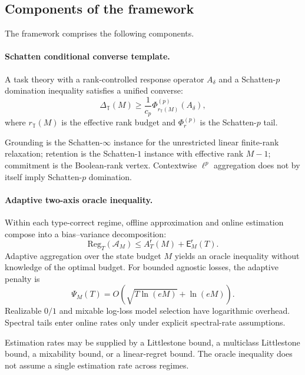 \documentclass[12pt]{article}
\theoremstyle{definition}
\newcommand{\Reg}{\mathrm{Reg}}
\newcommand{\Est}{\mathsf E}
\newcommand{\Aapp}{A_T}
\newcommand{\PsiAgg}{\Psi}
\begin{document}
\subsection{Components of the framework}
\label{subsec:integrated-components-intro}

The framework comprises the following components.

\paragraph{Schatten conditional converse template.}
A task theory with a rank-controlled response operator $A_\delta$ and a
Schatten-$p$ domination inequality satisfies a unified converse:
\[
\Delta_{\mathbb T}(M)
\ge
\frac1{c_p}
\Phi^{(p)}_{r_{\mathbb T}(M)}(A_\delta),
\]
where $r_{\mathbb T}(M)$ is the effective rank budget and
$\Phi^{(p)}_r$ is the Schatten-$p$ tail.

Grounding is the Schatten-$\infty$ instance for the unrestricted linear
finite-rank relaxation; retention is the Schatten-$1$ instance with effective
rank $M-1$; commitment is the Boolean-rank vertex.  Contextwise $\ell^p$
aggregation does not by itself imply Schatten-$p$ domination.

\paragraph{Adaptive two-axis oracle inequality.}
Within each type-correct regime, offline approximation and online estimation
compose into a bias--variance decomposition:
\[
\Reg_T(\mathcal A_M)
\le
\Aapp^{\mathsf r}(M)
+
\Est_M^{\mathsf r}(T).
\]
Adaptive aggregation over the state budget $M$ yields an oracle inequality
without knowledge of the optimal budget.  For bounded agnostic losses, the
adaptive penalty is
\[
\PsiAgg_M(T)
=
O\!\left(
\sqrt{T\ln(eM)}
+
\ln(eM)
\right).
\]
Realizable $0/1$ and mixable log-loss model selection have logarithmic
overhead.  Spectral tails enter online rates only under explicit spectral-rate
assumptions.

Estimation rates may be supplied by a Littlestone bound, a multiclass
Littlestone bound, a mixability bound, or a linear-regret bound.  The oracle
inequality does not assume a single estimation rate across regimes.
\end{document}
